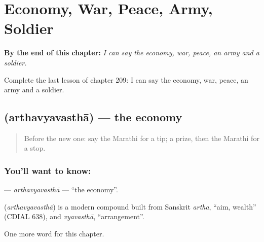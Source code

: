 
\chapter{Economy, War, Peace, Army, Soldier}
\label{ch:mr-economy-war-peace-army-soldier}

\begin{chapteropening}
\textbf{By the end of this chapter:} \emph{I can say the economy, war, peace, an army and a soldier.}

Complete the last lesson of chapter 209: I can say the economy, war, peace, an army and a soldier.
\end{chapteropening}

\section[\texorpdfstring{\mr{अर्थव्यवस्था} (arthavyavasthā)}{अर्थव्यवस्था (arthavyavasthā)}]{ (arthavyavasthā) — the economy}

\label{lesson:MR-C209-arthavyavastha}



\begin{quote}
Before the new one: say the Marathi for a tip; a prize, then the Marathi for a stop.
\end{quote}

\subsection*{You'll want to know: }
\textbf{} — \emph{arthavyavasthā} — \textquotedblleft{}the economy\textquotedblright{}.

\begin{cousinweb}
\textbf{} (\emph{arthavyavasthā}) is a modern compound built from Sanskrit \emph{artha}, \textquotedblleft{}aim, wealth\textquotedblright{} (CDIAL 638), and \emph{vyavasthā}, \textquotedblleft{}arrangement\textquotedblright{}.
\end{cousinweb}

\begin{grammarlens}[title={What you've built}]
One more word for this chapter.
\end{grammarlens}

